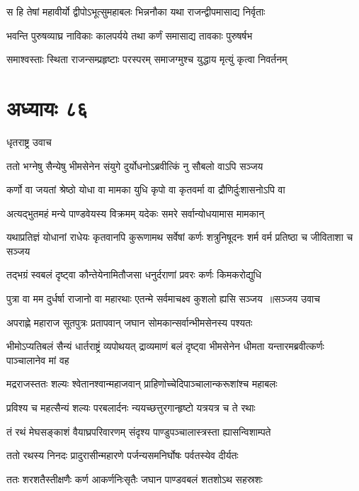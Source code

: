 \twolineshloka
{स हि तेषां महावीर्यो द्वीपोऽभूत्सुमहाबलः}
{भिन्ननौका यथा राजन्द्वीपमासाद्य निर्वृताः}


\twolineshloka
{भवन्ति पुरुषव्याघ्र नाविकाः कालपर्यये}
{तथा कर्णं समासाद्य तावकाः पुरुषर्षभ}


\twolineshloka
{समाश्वस्ताः स्थिता राजन्सम्प्रहृष्टाः परस्परम्}
{समाजग्मुश्च युद्धाय मृत्युं कृत्वा निवर्तनम्}


\chapter{अध्यायः ८६}
\twolineshloka
{धृतराष्ट्र उवाच}
{}


\twolineshloka
{ततो भग्नेषु सैन्येषु भीमसेनेन संयुगे}
{दुर्योधनोऽब्रवीत्किं नु सौबलो वाऽपि सञ्जय}


\twolineshloka
{कर्णो वा जयतां श्रेष्ठो योधा वा मामका युधि}
{कृपो वा कृतवर्मा वा द्रौणिर्दुःशासनोऽपि वा}


\twolineshloka
{अत्यद्भुतमहं मन्ये पाण्डवेयस्य विक्रमम्}
{यदेकः समरे सर्वान्योधयामास मामकान्}


\threelineshloka
{यथाप्रतिज्ञं योधानां राधेयः कृतवानपि}
{कुरूणामथ सर्वेषां कर्णः शत्रुनिषूदनः}
{शर्म वर्म प्रतिष्ठा च जीविताशा च सञ्जय}


\twolineshloka
{तद्भग्रं स्वबलं दृष्ट्वा कौन्तेयेनामितौजसा}
{धनुर्दराणां प्रवरः कर्णः किमकरोद्युधि}


\threelineshloka
{पुत्रा वा मम दुर्धर्षा राजानो वा महारथाः}
{एतन्मे सर्वमाचक्ष्व कुशलो ह्यसि सञ्जय ॥सञ्जय उवाच}
{}


\twolineshloka
{अपराह्णे महाराज सूतपुत्रः प्रतापवान्}
{जघान सोमकान्सर्वान्भीमसेनस्य पश्यतः}


भीमोऽप्यतिबलं सैन्यं धार्तराष्ट्रं व्यपोथयत्
\twolineshloka
{द्राव्यमाणं बलं दृष्ट्वा भीमसेनेन धीमता}
{यन्तारमब्रवीत्कर्णः पाञ्चालानेव मां वह}


\twolineshloka
{मद्रराजस्ततः शल्यः श्वेतानश्वान्महाजवान्}
{प्राहिणोच्चेदिपाञ्चालान्करूशांश्च महाबलः}


\twolineshloka
{प्रविश्य च महत्सैन्यं शल्यः परबलार्दनः}
{न्ययच्छत्तुरगान्हृष्टो यत्रयत्र च ते रथाः}


\twolineshloka
{तं रथं मेघसङ्काशं वैयाघ्रपरिवारणम्}
{संदृश्य पाण्डुपञ्चालास्त्रस्ता ह्यासन्विशाम्पते}


\twolineshloka
{ततो रथस्य निनदः प्रादुरासीन्महारणे}
{पर्जन्यसमनिर्घोषः पर्वतस्येव दीर्यतः}


\twolineshloka
{ततः शरशतैस्तीक्षणैः कर्ण आकर्णनिःसृतैः}
{जघान पाण्डवबलं शतशोऽथ सहस्रशः}


